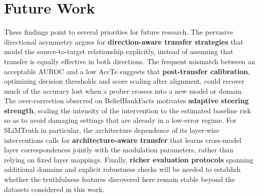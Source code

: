\section{Future Work}
These findings point to several priorities for future research. The pervasive directional asymmetry argues for \textbf{direction-aware transfer strategies} that model the source-to-target relationship explicitly, instead of assuming that transfer is equally effective in both directions. The frequent mismatch between an acceptable AUROC and a low AccTe suggests that \textbf{post-transfer calibration}, optimizing decision thresholds and score scaling after alignment, could recover much of the accuracy lost when a prober crosses into a new model or domain. The over-correction observed on BeliefBankFacts motivates \textbf{adaptive steering strength}, scaling the intensity of the intervention to the estimated baseline risk so as to avoid damaging settings that are already in a low-error regime. For SLiMTruth in particular, the architecture dependence of its layer-wise interventions calls for \textbf{architecture-aware transfer} that learns cross-model layer correspondences jointly with the modulation parameters, rather than relying on fixed layer mappings. Finally, \textbf{richer evaluation protocols} spanning additional domains and explicit robustness checks will be needed to establish whether the truthfulness features discovered here remain stable beyond the datasets considered in this work.
